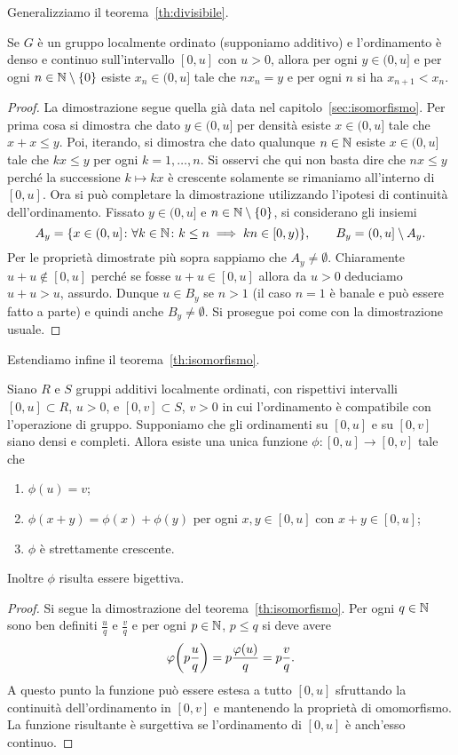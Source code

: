 Generalizziamo il teorema~\ref{th:divisibile}.
\begin{theorem}
Se $G$ è un gruppo localmente ordinato (supponiamo additivo)
e l'ordinamento è denso e continuo sull'intervallo $[0,u]$
con $u>0$, 
allora per ogni $y\in(0,u]$ 
e per ogni $n\in {\mathbb N}\setminus{\left\{ 0 \right\}}$ 
esiste $x_n\in(0,u]$ tale che 
$n x_n = y$ e per ogni $n$ si ha $x_{n+1}< x_n$.
\end{theorem}
%
\begin{proof}
La dimostrazione segue quella già data nel capitolo~\ref{sec:isomorfismo}.
Per prima cosa si dimostra che dato $y\in(0,u]$ 
per densità esiste $x\in (0,u]$ tale che $x+x\le y$.
Poi, iterando, si dimostra che dato qualunque $n\in {\mathbb N}$ 
esiste $x\in (0,u]$ tale che $kx\le y$ per ogni $k=1,\dots, n$.
Si osservi che qui non basta dire che $nx\le y$ perché 
la successione $k\mapsto kx$ è crescente solamente se rimaniamo 
all'interno di $[0,u]$.
Ora si può completare la dimostrazione utilizzando l'ipotesi di 
continuità dell'ordinamento. 
Fissato $y\in(0,u]$ e $n\in {\mathbb N}\setminus{\left\{ 0 \right\}}$, 
si considerano gli insiemi 
\[
  A_y = {\left\{ x\in(0,u]\colon \forall k\in {\mathbb N}\colon k\le n\implies kn \in [0,y)  \right\}},
  \qquad 
  B_y = (0,u] \setminus A_y.
\]
Per le proprietà dimostrate più sopra sappiamo che $A_y \neq \emptyset$.
Chiaramente $u+u\not \in[0,u]$ perché se fosse $u+u\in[0,u]$ allora 
da $u>0$ deduciamo $u+u>u$, assurdo. 
Dunque $u\in B_y$ se $n>1$ (il caso $n=1$ è banale e può essere fatto 
a parte) e quindi anche $B_y\neq \emptyset$.
Si prosegue poi come con la dimostrazione usuale.
\end{proof}

Estendiamo infine il teorema~\ref{th:isomorfismo}.
%
\begin{theorem}[omomorfismo]
  \label{th:omomorfismo_U}
Siano $R$ e $S$ gruppi additivi localmente ordinati, con rispettivi 
intervalli $[0,u]\subset R$, $u>0$, e $[0,v]\subset S$, 
$v>0$ in cui l'ordinamento 
è compatibile con l'operazione di gruppo.
Supponiamo che gli ordinamenti su $[0,u]$ e su $[0,v]$ siano densi e completi.
Allora esiste una unica funzione $\phi\colon [0,u]\to[0,v]$ tale che 
\begin{enumerate}
  \item $\phi(u)=v$;
  \item $\phi(x+y) = \phi(x)+\phi(y)$ per ogni $x,y\in [0,u]$ con $x+y\in [0,u]$;
  \item $\phi$ è strettamente crescente.
\end{enumerate}
Inoltre $\phi$ risulta essere bigettiva.
\end{theorem}
%
\begin{proof}
Si segue la dimostrazione del teorema~\ref{th:isomorfismo}.
Per ogni $q\in {\mathbb N}$ sono ben definiti $\frac u q$ e $\frac v q$ 
e per ogni $p\in {\mathbb N}$, $p\le q$ si deve 
avere
\[
    \varphi{\left( p\frac u q \right)} = p \frac{\varphi(u)} q = p \frac{v}{q}.
\]
A questo punto la funzione può essere estesa a tutto $[0,u]$ 
sfruttando la continuità dell'ordinamento in $[0,v]$ e mantenendo 
la proprietà di omomorfismo.
La funzione risultante è surgettiva se l'ordinamento 
di $[0,u]$ è anch'esso continuo.
\end{proof}

